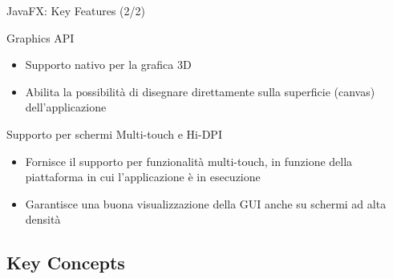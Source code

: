\documentclass[presentation]{beamer}
\begin{document}
\begin{frame}{JavaFX: Key Features (2/2)}
\begin{block}{Graphics API}
\begin{itemize}
\item Supporto nativo per la grafica 3D
\item Abilita la possibilità di disegnare direttamente sulla superficie (canvas) dell'applicazione
\end{itemize}
\end{block}
%
\begin{block}{Supporto per schermi Multi-touch e Hi-DPI}
\begin{itemize}
\item Fornisce il supporto per funzionalità  multi-touch, in funzione della piattaforma in cui l'applicazione è in esecuzione
\item Garantisce una buona visualizzazione della GUI anche su schermi ad alta densità
\end{itemize}
\end{block}
\end{frame}


\subsection{Key Concepts}
\end{document}
